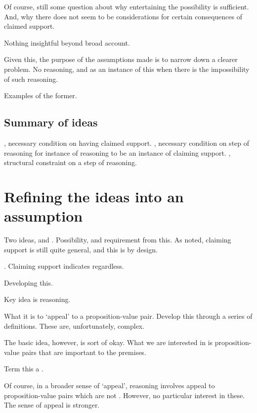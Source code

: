 \begin{note}
  Of course, still some question about why entertaining the possibility is sufficient.
  And, why there does not seem to be considerations for certain consequences of claimed support.

  Nothing insightful beyond broad account.

  Given this, the purpose of the assumptions made is to narrow down a clearer problem.
  No reasoning, and as an instance of this when there is the impossibility of such reasoning.

  Examples of the former.
\end{note}

\subsection{Summary of ideas}
\label{sec:summary-1}

\begin{note}
  \ideaS{}, necessary condition on having claimed support.
  \ideaCS{}, necessary condition on step of reasoning for instance of reasoning to be an instance of claiming support.
  \ideaCSC{}, structural constraint on a step of reasoning.
\end{note}

\section{Refining the ideas into an assumption}
\label{sec:assumpt-from-ideas}

\begin{note}
  Two ideas, \ideaS{} and \ideaCS{}.
  Possibility, and requirement from this.
  As noted, claiming support is still quite general, and this is by design.
\end{note}

\begin{note}
  \ideaCS{}.
  Claiming support indicates regardless.

  Developing this.

  Key idea is reasoning.

  What it is to `appeal' to a proposition-value pair.
  Develop this through a series of definitions.
  These are, unfortunately, complex.

  The basic idea, however, is sort of okay.
  What we are interested in is proposition-value pairs that are important to the premises.

  Term this a \requ{}.

  Of course, in a broader sense of `appeal', reasoning involves appeal to proposition-value pairs which are not .
  However, no particular interest in these.
  The sense of appeal is stronger.
\end{note}

